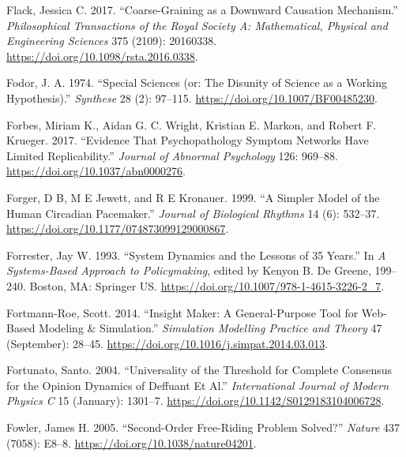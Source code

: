 \documentclass[
  a4paper,
  DIV=11,
  numbers=noendperiod,
  oneside]{scrreprt}
\newlength{\cslhangindent}
\newlength{\cslentryspacingunit} %
\newenvironment{CSLReferences}[2] %
 {%
  \setlength{\parindent}{0pt}
  \ifodd #1
  \let\oldpar\par
  \def\par{\hangindent=\cslhangindent\oldpar}
  \fi
  \setlength{\parskip}{#2\cslentryspacingunit}
 }%
 {}
\begin{document}
\begin{CSLReferences}{1}{0}
\leavevmode{}%
Flack, Jessica C. 2017. {``Coarse-Graining as a Downward Causation
Mechanism.''} \emph{Philosophical Transactions of the Royal Society A:
Mathematical, Physical and Engineering Sciences} 375 (2109): 20160338.
\url{https://doi.org/10.1098/rsta.2016.0338}.

\leavevmode{}%
Fodor, J. A. 1974. {``Special Sciences (or: {The} Disunity of Science as
a Working Hypothesis).''} \emph{Synthese} 28 (2): 97--115.
\url{https://doi.org/10.1007/BF00485230}.

\leavevmode{}%
Forbes, Miriam K., Aidan G. C. Wright, Kristian E. Markon, and Robert F.
Krueger. 2017. {``Evidence That Psychopathology Symptom Networks Have
Limited Replicability.''} \emph{Journal of Abnormal Psychology} 126:
969--88. \url{https://doi.org/10.1037/abn0000276}.

\leavevmode{}%
Forger, D B, M E Jewett, and R E Kronauer. 1999. {``A Simpler Model of
the Human Circadian Pacemaker.''} \emph{Journal of Biological Rhythms}
14 (6): 532--37. \url{https://doi.org/10.1177/074873099129000867}.

\leavevmode{}%
Forrester, Jay W. 1993. {``System {Dynamics} and the {Lessons} of 35
{Years}.''} In \emph{A {Systems-Based Approach} to {Policymaking}},
edited by Kenyon B. De Greene, 199--240. {Boston, MA}: {Springer US}.
\url{https://doi.org/10.1007/978-1-4615-3226-2_7}.

\leavevmode{}%
Fortmann-Roe, Scott. 2014. {``Insight {Maker}: {A} General-Purpose Tool
for Web-Based Modeling \& Simulation.''} \emph{Simulation Modelling
Practice and Theory} 47 (September): 28--45.
\url{https://doi.org/10.1016/j.simpat.2014.03.013}.

\leavevmode{}%
Fortunato, Santo. 2004. {``Universality of the {Threshold} for {Complete
Consensus} for the {Opinion Dynamics} of {Deffuant} Et Al.''}
\emph{International Journal of Modern Physics C} 15 (January): 1301--7.
\url{https://doi.org/10.1142/S0129183104006728}.

\leavevmode{}%
Fowler, James H. 2005. {``Second-Order Free-Riding Problem Solved?''}
\emph{Nature} 437 (7058): E8--8.
\url{https://doi.org/10.1038/nature04201}.


\end{CSLReferences}
\end{document}
